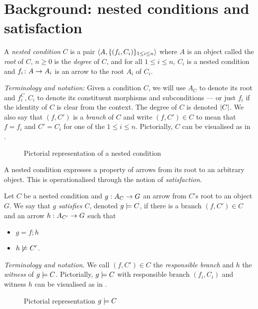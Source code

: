 \section{Background: nested conditions and satisfaction}
 
\begin{definition}
  A \emph{nested condition} $C$ is a pair $\langle{A,\{{(f_i,C_i)}\}_{1\leq i\leq n}}\rangle$ where $A$ is an object called the \emph{root} of $C$, $n\geq 0$ is the \emph{degree} of $C$, and for all $1\leq i\leq n$, $C_i$ is a nested condition and $f_i\colon A\rightarrow A_i$ is an arrow to the root $A_i$ of $C_i$.
\end{definition}
%
\emph{Terminology and notation:} Given a condition $C$, we will use $A_C$ to denote its root and $f^C_i,C_i$ to denote its constituent morphisms and subconditions --- or just $f_i$ if the identity of $C$ is clear from the context. The degree of $C$ is denoted $|{C}|$. We also say that $(f,C')$ is a \emph{branch} of $C$ and write $(f,C')\in C$ to mean that $f=f_i$ and $C'=C_i$ for one of the $1\leq i\leq n$. Pictorially, $C$ can be visualised as in .
%
\begin{figure}
  \centering
  
  \caption{Pictorial representation of a nested condition}
\end{figure}

\medskip\noindent A nested condition expresses a property of arrows from its root to an arbitrary object. This is operationalised through the notion of \emph{satisfaction}.

\begin{definition}
  Let $C$ be a nested condition and $g:A_C\rightarrow G$ an arrow from $C$'s root to an object $G$. We say that \emph{$g$ satisfies $C$}, denoted $g\models C$, if there is a branch $(f,C')\in C$ and an arrow $h:A_{C'}\rightarrow G$ such that
  \begin{itemize}
  \item $g=f;h$
  \item $h\not\models C'$.
  \end{itemize}
\end{definition}
%
\emph{Terminology and notation.} We call $(f,C')\in C$ the \emph{responsible branch} and $h$ the \emph{witness} of $g\models C$. Pictorially, $g\models C$ with responsible branch $(f_i,C_i)$ and witness $h$ can be visualised as in .
%
\begin{figure}
  \centering
  
  \caption{Pictorial representation $g\models C$}
\end{figure}

